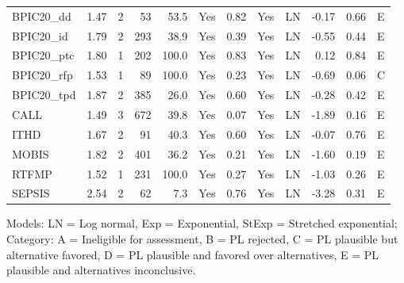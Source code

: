 {\begin{tabular}{lrrrrcrclrrl}
BPIC20\_dd & 1.47 & 2 & 53 & 53.5 & Yes & 0.82 & Yes & LN & -0.17 & 0.66 & \cellcolor[HTML]{19C8C8} E \\
BPIC20\_id & 1.79 & 2 & 293 & 38.9 & Yes & 0.39 & Yes & LN & -0.55 & 0.44 & \cellcolor[HTML]{19C8C8} E \\
BPIC20\_ptc & 1.80 & 1 & 202 & 100.0 & Yes & 0.83 & Yes & LN & 0.12 & 0.84 & \cellcolor[HTML]{19C8C8} E \\
BPIC20\_rfp & 1.53 & 1 & 89 & 100.0 & Yes & 0.23 & Yes & LN & -0.69 & 0.06 & \cellcolor[HTML]{9670BD} C \\
BPIC20\_tpd & 1.87 & 2 & 385 & 26.0 & Yes & 0.60 & Yes & LN & -0.28 & 0.42 & \cellcolor[HTML]{19C8C8} E \\
CALL & 1.49 & 3 & 672 & 39.8 & Yes & 0.07 & Yes & LN & -1.89 & 0.16 & \cellcolor[HTML]{19C8C8} E \\
ITHD & 1.67 & 2 & 91 & 40.3 & Yes & 0.60 & Yes & LN & -0.07 & 0.76 & \cellcolor[HTML]{19C8C8} E \\
MOBIS & 1.82 & 2 & 401 & 36.2 & Yes & 0.21 & Yes & LN & -1.60 & 0.19 & \cellcolor[HTML]{19C8C8} E \\
RTFMP & 1.52 & 1 & 231 & 100.0 & Yes & 0.27 & Yes & LN & -1.03 & 0.26 & \cellcolor[HTML]{19C8C8} E \\
SEPSIS & 2.54 & 2 & 62 & 7.3 & Yes & 0.76 & Yes & LN & -3.28 & 0.31 & \cellcolor[HTML]{19C8C8} E \\
\bottomrule
\end{tabular}
}
\begin{center}\footnotesize
Models: LN = Log normal, Exp = Exponential, StExp = Stretched exponential; \quad Category: A = Ineligible for assessment, B = PL rejected, C = PL plausible but alternative favored, D = PL plausible and favored over alternatives, E = PL plausible and alternatives inconclusive.
\end{center}
